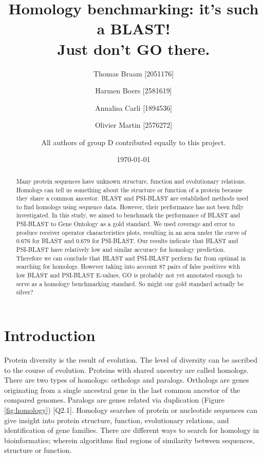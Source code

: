 \documentclass{article}
\title{Homology benchmarking: it's such a BLAST! \\ \large Just don't GO there.}
\author{
	Thomas Braam [2051176]
    \and
    Harmen Boers [2581619]
    \and
    Annalisa Carli [1894536]
    \and
	Olivier Martin [2576272]
    \and 
    \small All authors of group D contributed equally to this project.}
\date{\today}
\begin{document}
\maketitle

\begin{abstract}

Many protein sequences have unknown structure, function and evolutionary relations. Homologs can tell us something about the structure or function of a protein because they share a common ancestor. BLAST and PSI-BLAST are established methods used to find homologs using sequence data. However, their performance has not been fully investigated. In this study, we aimed to benchmark the performance of BLAST and PSI-BLAST to Gene Ontology as a gold standard. We used coverage and error to produce receiver operator characteristics plots, resulting in an area under the curve of 0.676 for BLAST and 0.679 for PSI-BLAST. Our results indicate that BLAST and PSI-BLAST have relatively low and similar accuracy for homology prediction. Therefore we can conclude that BLAST and PSI-BLAST perform far from optimal in searching for homologs. However taking into account 87 pairs of false positives with low BLAST and PSI-BLAST E-values, GO is probably not yet annotated enough to serve as a homology benchmarking standard. So might our gold standard actually be silver?

\end{abstract}

\newpage
\tableofcontents

\newpage
\section{Introduction} 

Protein diversity is the result of evolution. The level of diversity can be ascribed to the course of evolution. Proteins with shared ancestry are called homologs. There are two types of homologs: orthologs and paralogs. Orthologs are genes originating from a single ancestral gene in the last common ancestor of the compared genomes. Paralogs are genes related via duplication \citep{koonin_orthologs_2005} (Figure \ref{fig:homology}) [Q2.1]. Homology searches of protein or nucleotide sequences can give insight into protein structure, function, evolutionary relations, and identification of gene families. There are different ways to search for homology in bioinformatics; wherein algorithms find regions of similarity between sequences, structure or function.
\end{document}
